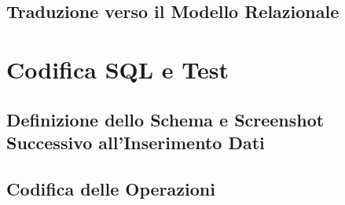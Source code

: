 \documentclass[12pt]{article} %
\begin{document}
		
		\subsection{Traduzione verso il Modello Relazionale}

		


	\section{Codifica SQL e Test}

		\subsection{Definizione dello Schema e Screenshot Successivo all'Inserimento Dati}
		


		\subsection{Codifica delle Operazioni}

		

\end{document}
